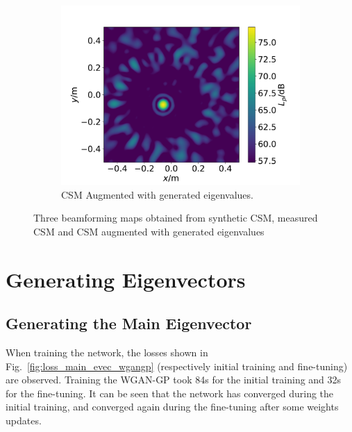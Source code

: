 \documentclass[11pt,a4paper,twoside]{report}
\begin{document}
\begin{figure}
    \hfill
    \begin{subfigure}{0.45\textwidth}
        \centering
        \includegraphics[width=1.3\textwidth]{figs/data_augmentation_evals_augmented_csm.pdf}
        \caption{CSM Augmented with generated eigenvalues.} 
        \label{fig:data_augmentation_evals_augmented_csm}
    \end{subfigure}
            
    \caption{Three beamforming maps obtained from synthetic CSM, measured CSM and CSM augmented with generated eigenvalues}
    \label{fig:data_augmentation_evals}
\end{figure}

\section{Generating Eigenvectors}

\subsection{Generating the Main Eigenvector}

When training the network, the losses shown in Fig.~\ref{fig:loss_main_evec_wgangp} (respectively initial training and fine-tuning) are observed. Training the WGAN-GP took 84s for the initial training and 32s for the fine-tuning. It can be seen that the network has converged during the initial training, and converged again during the fine-tuning after some weights updates.
\end{document}
